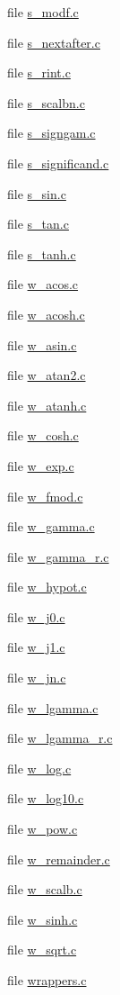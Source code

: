 \begin{DoxyCompactItemize}
\item 
file \hyperlink{s__modf_8c}{s\+\_\+modf.\+c}
\item 
file \hyperlink{s__nextafter_8c}{s\+\_\+nextafter.\+c}
\item 
file \hyperlink{s__rint_8c}{s\+\_\+rint.\+c}
\item 
file \hyperlink{s__scalbn_8c}{s\+\_\+scalbn.\+c}
\item 
file \hyperlink{s__signgam_8c}{s\+\_\+signgam.\+c}
\item 
file \hyperlink{s__significand_8c}{s\+\_\+significand.\+c}
\item 
file \hyperlink{s__sin_8c}{s\+\_\+sin.\+c}
\item 
file \hyperlink{s__tan_8c}{s\+\_\+tan.\+c}
\item 
file \hyperlink{s__tanh_8c}{s\+\_\+tanh.\+c}
\item 
file \hyperlink{w__acos_8c}{w\+\_\+acos.\+c}
\item 
file \hyperlink{w__acosh_8c}{w\+\_\+acosh.\+c}
\item 
file \hyperlink{w__asin_8c}{w\+\_\+asin.\+c}
\item 
file \hyperlink{w__atan2_8c}{w\+\_\+atan2.\+c}
\item 
file \hyperlink{w__atanh_8c}{w\+\_\+atanh.\+c}
\item 
file \hyperlink{w__cosh_8c}{w\+\_\+cosh.\+c}
\item 
file \hyperlink{w__exp_8c}{w\+\_\+exp.\+c}
\item 
file \hyperlink{w__fmod_8c}{w\+\_\+fmod.\+c}
\item 
file \hyperlink{w__gamma_8c}{w\+\_\+gamma.\+c}
\item 
file \hyperlink{w__gamma__r_8c}{w\+\_\+gamma\+\_\+r.\+c}
\item 
file \hyperlink{w__hypot_8c}{w\+\_\+hypot.\+c}
\item 
file \hyperlink{w__j0_8c}{w\+\_\+j0.\+c}
\item 
file \hyperlink{w__j1_8c}{w\+\_\+j1.\+c}
\item 
file \hyperlink{w__jn_8c}{w\+\_\+jn.\+c}
\item 
file \hyperlink{w__lgamma_8c}{w\+\_\+lgamma.\+c}
\item 
file \hyperlink{w__lgamma__r_8c}{w\+\_\+lgamma\+\_\+r.\+c}
\item 
file \hyperlink{w__log_8c}{w\+\_\+log.\+c}
\item 
file \hyperlink{w__log10_8c}{w\+\_\+log10.\+c}
\item 
file \hyperlink{w__pow_8c}{w\+\_\+pow.\+c}
\item 
file \hyperlink{w__remainder_8c}{w\+\_\+remainder.\+c}
\item 
file \hyperlink{w__scalb_8c}{w\+\_\+scalb.\+c}
\item 
file \hyperlink{w__sinh_8c}{w\+\_\+sinh.\+c}
\item 
file \hyperlink{w__sqrt_8c}{w\+\_\+sqrt.\+c}
\item 
file \hyperlink{wrappers_8c}{wrappers.\+c}
\end{DoxyCompactItemize}
